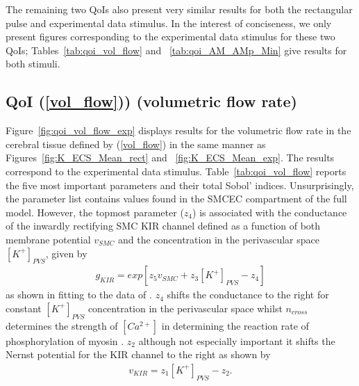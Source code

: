The remaining two QoIs also present very similar results for both the rectangular pulse and experimental data stimulus. In the interest of conciseness, we only present figures corresponding to the experimental data stimulus for these two QoIs; Tables~\ref{tab:qoi_vol_flow} and ~\ref{tab:qoi_AM_AMp_Min} give results for both stimuli. 

\subsection{QoI (\eqref{vol_flow})) (volumetric flow rate)}

Figure~\ref{fig:qoi_vol_flow_exp} displays results for the volumetric flow rate in the cerebral tissue defined by (\ref{vol_flow})  in the same manner as Figures~\ref{fig:K_ECS_Mean_rect} and ~\ref{fig:K_ECS_Mean_exp}. The results correspond to the experimental data stimulus.  Table~\ref{tab:qoi_vol_flow} reports the five most important parameters and their total Sobol' indices. Unsurprisingly, the parameter list contains values found in the SMCEC compartment of the full model. However, the topmost parameter ($z_4$) is associated with the conductance of the inwardly rectifying SMC KIR channel defined as a function of both membrane potential $v_{SMC}$ and the \pot concentration in the perivascular space $[K^+]_{PVS}$, given by 
\begin{eqnarray}
g_{KIR}=exp\left[ z_5 v_{SMC}+z_3[K^+]_{PVS}-z_4\right]  \label{eq:gkir}
\end{eqnarray}
as shown in \cite{Dormanns2015} fitting to the data of \cite{Filosa2006}. $z_4$ shifts the conductance to the right for constant $[K^+]_{PVS}$  concentration in the perivascular space whilst $n_{cross}$ determines the strength of $[Ca^{2+}]$ in determining the reaction rate of phosphorylation of myosin \cite{Hai1988}. $z_2$ although not especially important it shifts the Nernst potential for the KIR channel to the right as shown by 
\begin{eqnarray}
v_{KIR}=z_1 [K^+]_{PVS}-z_2. \label{vkir}
\end{eqnarray}

